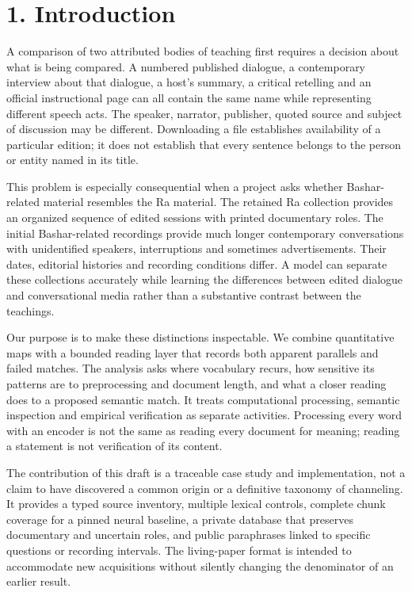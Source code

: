 \documentclass[
  11pt,
]{article}
\begin{document}
\FloatBarrier

\section{1. Introduction}\label{introduction}

A comparison of two attributed bodies of teaching first requires a
decision about what is being compared. A numbered published dialogue, a
contemporary interview about that dialogue, a host's summary, a critical
retelling and an official instructional page can all contain the same
name while representing different speech acts. The speaker, narrator,
publisher, quoted source and subject of discussion may be different.
Downloading a file establishes availability of a particular edition; it
does not establish that every sentence belongs to the person or entity
named in its title.

This problem is especially consequential when a project asks whether
Bashar-related material resembles the Ra material. The retained Ra
collection provides an organized sequence of edited sessions with
printed documentary roles. The initial Bashar-related recordings provide
much longer contemporary conversations with unidentified speakers,
interruptions and sometimes advertisements. Their dates, editorial
histories and recording conditions differ. A model can separate these
collections accurately while learning the differences between edited
dialogue and conversational media rather than a substantive contrast
between the teachings.

Our purpose is to make these distinctions inspectable. We combine
quantitative maps with a bounded reading layer that records both
apparent parallels and failed matches. The analysis asks where
vocabulary recurs, how sensitive its patterns are to preprocessing and
document length, and what a closer reading does to a proposed semantic
match. It treats computational processing, semantic inspection and
empirical verification as separate activities. Processing every word
with an encoder is not the same as reading every document for meaning;
reading a statement is not verification of its content.

The contribution of this draft is a traceable case study and
implementation, not a claim to have discovered a common origin or a
definitive taxonomy of channeling. It provides a typed source inventory,
multiple lexical controls, complete chunk coverage for a pinned neural
baseline, a private database that preserves documentary and uncertain
roles, and public paraphrases linked to specific questions or recording
intervals. The living-paper format is intended to accommodate new
acquisitions without silently changing the denominator of an earlier
result.
\end{document}
